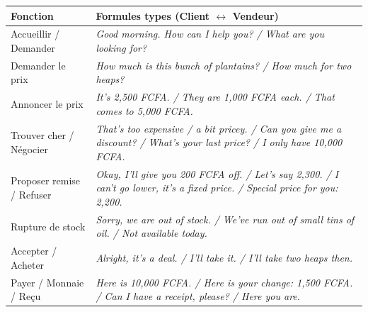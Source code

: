 \documentclass[11pt]{article}
\newcommand{\eng}[1]{\ifmmode\text{\textit{#1}}\else\begingroup\selectlanguage{english}\itshape #1\endgroup\fi}
\begin{document}
\begin{propriete}
\begin{center}
\begin{tabularx}{\linewidth}{|X|X|}
\hline
\rowcolor{popblueL} \textbf{Fonction} & \textbf{Formules types (Client $\leftrightarrow$ Vendeur)} \\
\hline
Accueillir / Demander & \eng{Good morning. How can I help you? / What are you looking for?} \\
\hline
Demander le prix & \eng{How much is this bunch of plantains? / How much for two heaps?} \\
\hline
Annoncer le prix & \eng{It's 2,500 FCFA. / They are 1,000 FCFA each. / That comes to 5,000 FCFA.} \\
\hline
Trouver cher / Négocier & \eng{That's too expensive / a bit pricey. / Can you give me a discount? / What's your last price? / I only have 10,000 FCFA.} \\
\hline
Proposer remise / Refuser & \eng{Okay, I'll give you 200 FCFA off. / Let's say 2,300. / I can't go lower, it's a fixed price. / Special price for you: 2,200.} \\
\hline
Rupture de stock & \eng{Sorry, we are out of stock. / We've run out of small tins of oil. / Not available today.} \\
\hline
Accepter / Acheter & \eng{Alright, it's a deal. / I'll take it. / I'll take two heaps then.} \\
\hline
Payer / Monnaie / Reçu & \eng{Here is 10,000 FCFA. / Here is your change: 1,500 FCFA. / Can I have a receipt, please? / Here you are.} \\
\hline
\end{tabularx}
\end{center}
\end{propriete}
\end{document}
